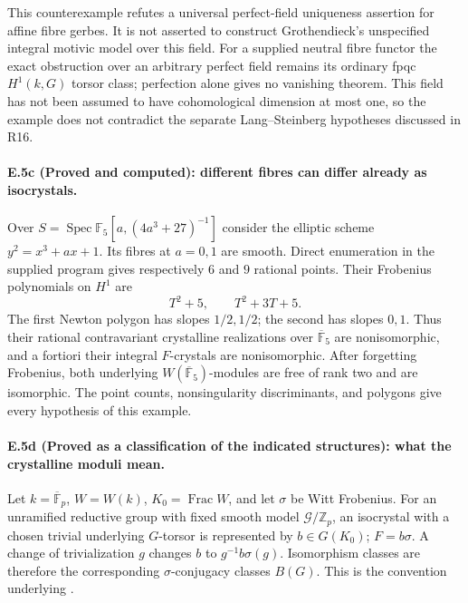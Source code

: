 This counterexample refutes a universal perfect-field uniqueness
assertion for affine fibre gerbes. It is not asserted to construct
Grothendieck's unspecified integral motivic model over this field.
For a supplied neutral fibre functor the exact obstruction over an
arbitrary perfect field remains its ordinary fpqc $H^1(k,G)$ torsor
class; perfection alone gives no vanishing theorem.
This field has not been assumed to have cohomological dimension at
most one, so the example does not contradict the separate
Lang--Steinberg hypotheses discussed in R16.

\paragraph{E.5c (Proved and computed): different fibres can differ already as isocrystals.}
Over
$S=\operatorname{Spec}\mathbb F_5[a,(4a^3+27)^{-1}]$ consider the elliptic
scheme $y^2=x^3+ax+1$. Its fibres at $a=0,1$ are smooth. Direct enumeration
in the supplied program gives respectively $6$ and $9$ rational points.
Their Frobenius polynomials on $H^1$ are
\[
 T^2+5,\qquad T^2+3T+5.
 \tag{E.5}
\]
The first Newton polygon has slopes $1/2,1/2$; the second has slopes
$0,1$. Thus their rational contravariant crystalline realizations over
$\overline{\mathbb F}_5$ are nonisomorphic, and a fortiori their integral
$F$-crystals are nonisomorphic. After forgetting Frobenius, both underlying
$W(\overline{\mathbb F}_5)$-modules are free of rank two and are isomorphic.
The point counts, nonsingularity discriminants, and polygons give every
hypothesis of this example.

\paragraph{E.5d (Proved as a classification of the indicated structures): what the crystalline moduli mean.}
Let $k=\overline{\mathbb F}_p$, $W=W(k)$, $K_0=\operatorname{Frac}W$, and
let $\sigma$ be Witt Frobenius. For an unramified reductive group with
fixed smooth model $\mathcal G/\mathbb Z_p$, an isocrystal with a chosen
trivial underlying $G$-torsor is represented by $b\in G(K_0)$;
$F=b\sigma$. A change of trivialization $g$ changes $b$ to
$g^{-1}b\sigma(g)$. Isomorphism classes are therefore the corresponding
$\sigma$-conjugacy classes $B(G)$. This is the convention underlying
\citet[Introduction and \S\S3--4]{D_Kottwitz1985}.

